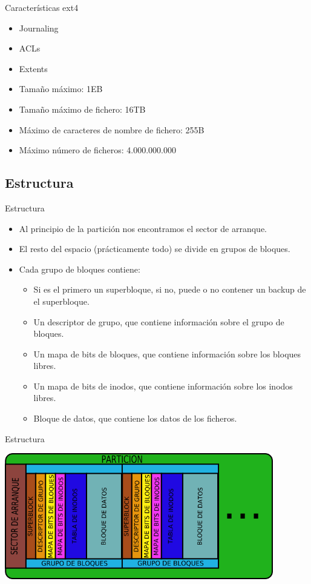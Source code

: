 \begin{frame}{Características ext4}
  \begin{itemize}
    \item Journaling
    \item ACLs
    \item Extents
    \item Tamaño máximo: 1EB
    \item Tamaño máximo de fichero: 16TB
    \item Máximo de caracteres de nombre de fichero: 255B
    \item Máximo número de ficheros: 4.000.000.000
  \end{itemize}
\end{frame}

\subsection{Estructura}
\begin{frame}{Estructura}
  \begin{itemize}
    \item Al principio de la partición nos encontramos el sector de arranque.
    \item El resto del espacio (prácticamente todo) se divide en grupos de bloques.
    \item Cada grupo de bloques contiene:
    \begin{itemize}
      \item Si es el primero un superbloque, si no, puede o no contener un backup de el superbloque.
      \item Un descriptor de grupo, que contiene información sobre el grupo de bloques.
      \item Un mapa de bits de bloques, que contiene información sobre los bloques libres.
      \item Un mapa de bits de inodos, que contiene información sobre los inodos libres.
      \item Bloque de datos, que contiene los datos de los ficheros.
    \end{itemize}
  \end{itemize}
\end{frame}

\begin{frame}{Estructura}
  \begin{center}
    \includegraphics[height=5.5cm]{imgs/ext_struct.png}
  \end{center}
\end{frame}

